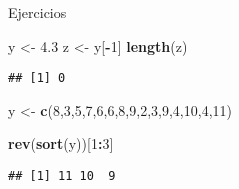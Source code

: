 \documentclass[ignorenonframetext,]{beamer}
\newenvironment{Shaded}{\begin{snugshade}}{\end{snugshade}}
\newcommand{\KeywordTok}[1]{\textcolor[rgb]{0.13,0.29,0.53}{\textbf{#1}}}
\newcommand{\DecValTok}[1]{\textcolor[rgb]{0.00,0.00,0.81}{#1}}
\newcommand{\FloatTok}[1]{\textcolor[rgb]{0.00,0.00,0.81}{#1}}
\newcommand{\StringTok}[1]{\textcolor[rgb]{0.31,0.60,0.02}{#1}}
\newcommand{\OperatorTok}[1]{\textcolor[rgb]{0.81,0.36,0.00}{\textbf{#1}}}
\newcommand{\NormalTok}[1]{#1}
\begin{document}
\begin{frame}[fragile]{Ejercicios}

\begin{Shaded}
\begin{Highlighting}[]
\NormalTok{y <-}\StringTok{ }\FloatTok{4.3}
\NormalTok{z <-}\StringTok{ }\NormalTok{y[}\OperatorTok{-}\DecValTok{1}\NormalTok{]}
\KeywordTok{length}\NormalTok{(z)}
\end{Highlighting}
\end{Shaded}
\pause
\begin{verbatim}
## [1] 0
\end{verbatim}

\begin{Shaded}
\begin{Highlighting}[]
\NormalTok{y <-}\StringTok{ }\KeywordTok{c}\NormalTok{(}\DecValTok{8}\NormalTok{,}\DecValTok{3}\NormalTok{,}\DecValTok{5}\NormalTok{,}\DecValTok{7}\NormalTok{,}\DecValTok{6}\NormalTok{,}\DecValTok{6}\NormalTok{,}\DecValTok{8}\NormalTok{,}\DecValTok{9}\NormalTok{,}\DecValTok{2}\NormalTok{,}\DecValTok{3}\NormalTok{,}\DecValTok{9}\NormalTok{,}\DecValTok{4}\NormalTok{,}\DecValTok{10}\NormalTok{,}\DecValTok{4}\NormalTok{,}\DecValTok{11}\NormalTok{)}
\end{Highlighting}
\end{Shaded}

\begin{Shaded}
\begin{Highlighting}[]
\KeywordTok{rev}\NormalTok{(}\KeywordTok{sort}\NormalTok{(y))[}\DecValTok{1}\OperatorTok{:}\DecValTok{3}\NormalTok{]}
\end{Highlighting}
\end{Shaded}
\pause
\begin{verbatim}
## [1] 11 10  9
\end{verbatim}

\end{frame}
\end{document}
